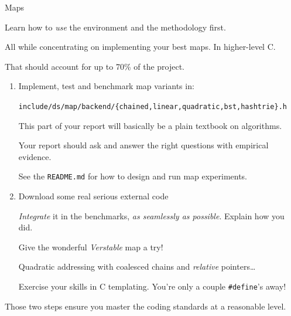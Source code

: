 \begin{frame}[fragile]{Maps}

  Learn how to {\em use} the environment and the methodology first.

  All while concentrating on implementing your best maps. In higher-level C.

  That should account for up to 70\% of the project.
  
  \begin{enumerate}
  \item Implement, test and benchmark map variants in:

    \texttt{include/ds/map/backend/\{chained,linear,quadratic,bst,hashtrie\}.h}
    
    This part of your report will basically be a plain textbook on algorithms.

    Your report should ask and answer the right questions with empirical evidence.

    See the \lstinline{README.md} for how to design and run map experiments.
    
  \item Download some real serious external code

    {\em Integrate} it in the benchmarks, {\em as seamlessly as possible}. Explain how you did.
    
    Give the wonderful {\em Verstable} map a try!

    Quadratic addressing with coalesced chains and {\em relative} pointers\dots

    Exercise your skills in C templating. You're only a couple \lstinline{#define}'s away!

  \end{enumerate}

  Those two steps ensure you master the coding standards at a reasonable level.
  
\end{frame}


